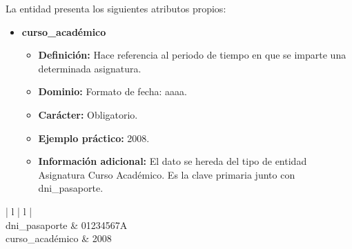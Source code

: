 \begin{description}
   \item[Descripción de los atributos propios] La entidad presenta los
   siguientes atributos propios:

   \begin{itemize}
   \item \textbf{curso\_académico}
      \begin{itemize}
         \item \textbf{Definición:} Hace referencia al periodo de tiempo en que se imparte una determinada asignatura.
         \item \textbf{Dominio:} Formato de fecha: aaaa.
         \item \textbf{Carácter:}  Obligatorio.
         \item \textbf{Ejemplo práctico:} 2008.
         \item \textbf{Información adicional:} El dato se hereda del tipo de entidad Asignatura Curso Académico. Es la clave primaria junto con dni\_pasaporte.
      \end{itemize}
   \end{itemize}

   \item[Ejemplo práctico]

   \item \begin{center}
            \begin{tabular}{ | l | l | }
            \hline
             \\
            \hline
            dni\_pasaporte & 01234567A \\
            \hline
            curso\_académico & 2008\\
            \hline
            \end{tabular}
         \end{center}
   \end{description}
